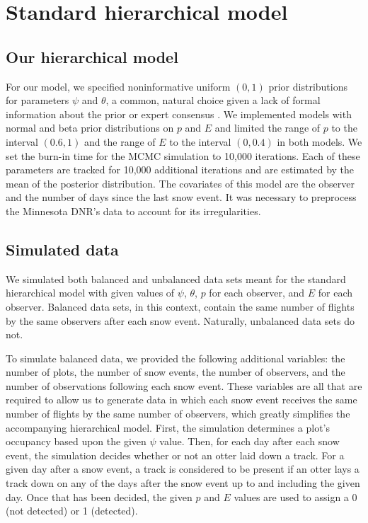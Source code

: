 \documentclass[12pt]{article}
\begin{document}
\section{Standard hierarchical model}

    \subsection{Our hierarchical model}
    For our model, we specified noninformative uniform \((0, 1)\) prior
    distributions for
    parameters \(\psi\) and \(\theta\), a common, natural choice given a lack of
    formal information about the prior or expert consensus \cite{MacKenzie2006}.
    We implemented models with normal and beta prior distributions on \(p\) and
    \(E\) and limited the range of \(p\) to the interval \((0.6, 1)\) and the
    range of \(E\) to the interval \((0, 0.4)\) in both models. We set the
    burn-in time for the MCMC simulation to 10,000 iterations. Each of these
    parameters are tracked for 10,000 additional iterations and are estimated
    by the mean of the posterior distribution. The covariates of this
    model are the observer and the number of days since the last snow event.
    It was necessary to preprocess the Minnesota DNR's data to account for its
    irregularities.

    \subsection{Simulated data}
    We simulated both balanced and unbalanced data sets meant for the standard
    hierarchical model with given values of \(\psi\), \(\theta\), \(p\) for each
    observer, and \(E\) for each observer.  Balanced data sets, in this context,
    contain the same number of flights by the same observers after each snow
    event.  Naturally, unbalanced data sets do not.

    To simulate balanced data, we provided the following additional variables:
    the number of plots, the number of snow events, the number of observers, and
    the number of observations following each snow event. These variables are
    all that are required to allow us to generate data in which each snow event
    receives the same number of flights by the same number of observers, which
    greatly simplifies the accompanying hierarchical model. First, the
    simulation determines a plot's occupancy based upon the given \(\psi\)
    value.
    Then, for each day after each snow event, the simulation decides whether or
    not an otter laid down a track. For a given day after a snow event, a track
    is considered to be present if an otter lays a track down on any of the days
    after the snow event up to and including the given day. Once that has been
    decided, the given \(p\) and \(E\) values are used to assign a 0 (not
    detected) or 1 (detected).
\end{document}
